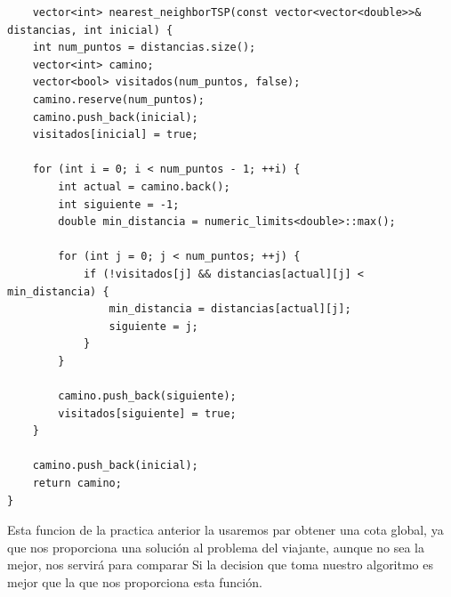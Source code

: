 \documentclass[11pt,openany]{book}
\begin{document}
\begin{lstlisting}
    vector<int> nearest_neighborTSP(const vector<vector<double>>& distancias, int inicial) {
    int num_puntos = distancias.size();
    vector<int> camino;
    vector<bool> visitados(num_puntos, false);
    camino.reserve(num_puntos);
    camino.push_back(inicial);
    visitados[inicial] = true;

    for (int i = 0; i < num_puntos - 1; ++i) {
        int actual = camino.back();
        int siguiente = -1;
        double min_distancia = numeric_limits<double>::max();

        for (int j = 0; j < num_puntos; ++j) {
            if (!visitados[j] && distancias[actual][j] < min_distancia) {
                min_distancia = distancias[actual][j];
                siguiente = j;
            }
        }

        camino.push_back(siguiente);
        visitados[siguiente] = true;
    }

    camino.push_back(inicial);
    return camino;
}
\end{lstlisting} 
Esta funcion de la practica anterior la usaremos par obtener una cota global, ya que nos proporciona una solución al problema del viajante, aunque no sea la mejor, nos servirá para comparar
Si la decision que toma nuestro algoritmo es mejor que la que nos proporciona esta función. 
\end{document}
